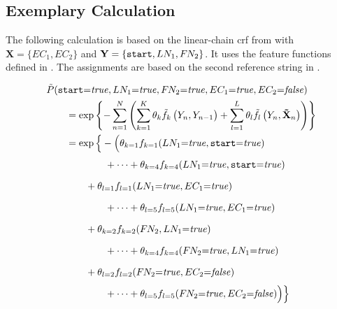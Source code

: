\subsection{Exemplary Calculation}\label{app:subsec-lccrf-example-calculation}
The following calculation is based on the \gls{linear-chain crf} from  with $\mathbf{X}=\{EC_1,EC_2\}$ and $\mathbf{Y}=\{\texttt{start},LN_1,F\hspace{-0.07em} N_2\}$.
It uses the \glspl{feature function} defined in .
The \glspl{assignment} are based on the second reference string in .

\begin{subequations}
\begin{equation*}
\begin{split}
  &\tilde{P}(\texttt{start}{=}\mathit{true},LN_1{=}\mathit{true},F\rs N_2{=}\mathit{true},EC_1{=}\mathit{true},EC_2{=}\mathit{false})\\
  &\hspace{2em} = \exp\left\{ -\sum_{n=1}^N \left(\sum_{k=1}^K\theta_k \tilde{f}_k\left(\vphantom{\tilde{X}}Y_n,Y_{n-1}\right)+\sum_{l=1}^L\theta_l \tilde{f}_l\left(Y_n,\mathbf{\tilde{X}}_n\right)\right) \right\} \\
  &\hspace{2em} = \exp\Big\{-\Big(\theta_{k=1}f_{k=1}(LN_1{=}\mathit{true},\texttt{start}{=}\mathit{true})\\
  &\hspace{6em}\vphantom{\Big\{}+\cdots+\theta_{k=4}f_{k=4}(LN_1{=}\mathit{true},\texttt{start}{=}\mathit{true})\\
  &\hspace{4em}\vphantom{\Big\{}+\theta_{l=1}f_{l=1}(LN_1{=}\mathit{true},EC_1{=}\mathit{true})\\
  &\hspace{6em}\vphantom{\Big\{}+\cdots+\theta_{l=5}f_{l=5}(LN_1{=}\mathit{true},EC_1{=}\mathit{true})\\
  &\hspace{4em}\vphantom{\Big\{}+\theta_{k=2}f_{k=2}(F\rs N_2,LN_1{=}\mathit{true})\\
  &\hspace{6em}\vphantom{\Big\{}+\cdots+\theta_{k=4}f_{k=4}(F\rs N_2{=}\mathit{true},LN_1{=}\mathit{true}) \\
  &\hspace{4em}\vphantom{\Big\{}+\theta_{l=2}f_{l=2}(F\rs N_2{=}\mathit{true},EC_2{=}\mathit{false})\\
  &\hspace{6em}\vphantom{\Big\{}+\cdots+\theta_{l=5}f_{l=5}(F\rs N_2{=}\mathit{true},EC_2{=}\mathit{false})\Big)\Big\}\\

\end{split}
\end{equation*}
\end{subequations}

